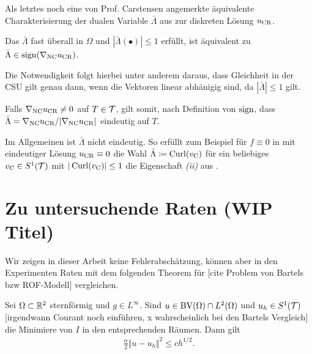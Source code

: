 Als letztes noch eine von Prof. Carstensen angemerkte äquivalente 
Charakterisierung der dualen Variable $\bar\Lambda$ aus
   zur diskreten Lösung
  $u_\textup{CR}$.
\begin{remark}
  Das $\bar\Lambda$ fast überall in $\Omega$
   und
  $|\bar\Lambda(\bullet)|\leq 1$ erfüllt, ist äquivalent zu 
  $\bar\Lambda\in\operatorname{sign}(\nabla_\textup{NC} u_\textup{CR})$.   

  Die Notwendigkeit folgt hierbei unter anderem daraus, dass Gleichheit in der
  CSU gilt genau dann, wenn die Vektoren linear abhänigig sind, da
  $|\bar\Lambda|\leq 1$ gilt.

  Falls $\nabla_\textup{NC}u_\textup{CR}\neq 0$ auf $T\in\mathcal{T}$, gilt somit, nach Definition von
  $\operatorname{sign}$, dass $\bar\Lambda=\nabla_\textup{NC}u_\textup{CR}/|\nabla_\textup{NC}u_\textup{CR}|$ eindeutig auf
  $T$.

  Im Allgemeinen ist $\bar\Lambda$ nicht eindeutig. So erfüllt zum Beispiel
  für $f\equiv 0$ in  mit eindeutiger Lösung
  $u_\textup{CR}\equiv 0$ die Wahl $\bar\Lambda\coloneqq \operatorname{Curl}(v_{\textup{C}})$ für ein beliebiges
  $v_{\textup{C}}\in S^1(\mathcal{T})$ mit $|\operatorname{Curl}(v_{\textup{C}})|\leq 1$ die Eigenschaft \textit{(ii)}
  aus .
\end{remark}

\section{Zu untersuchende Raten (WIP Titel)}
Wir zeigen in dieser Arbeit keine Fehlerabschätzung, können aber in den 
Experimenten Raten mit dem folgenden Theorem für
[cite Problem von Bartels bzw ROF-Modell] vergleichen.
\begin{theorem}
  \label{thm:errorEstimateCourant}
  Sei $\Omega\subset\mathbb{R}^2$ sternförmig und $g\in L^\infty$.
  Sind $u\in\textup{BV}(\Omega)\cap L^2(\Omega)$ und $u_h\in S^1(\mathcal{T})$ [irgendwann
  Courant noch einführen, x wahrscheinlich bei den Bartels Vergleich] die 
  Minimiere von $I$ in den entsprechenden Räumen.
  Dann gilt 
  \begin{align*}
    \frac{\alpha}{2}\Vert u-u_h\Vert^2\leq
    ch^{1/2}.
  \end{align*}
\end{theorem}

